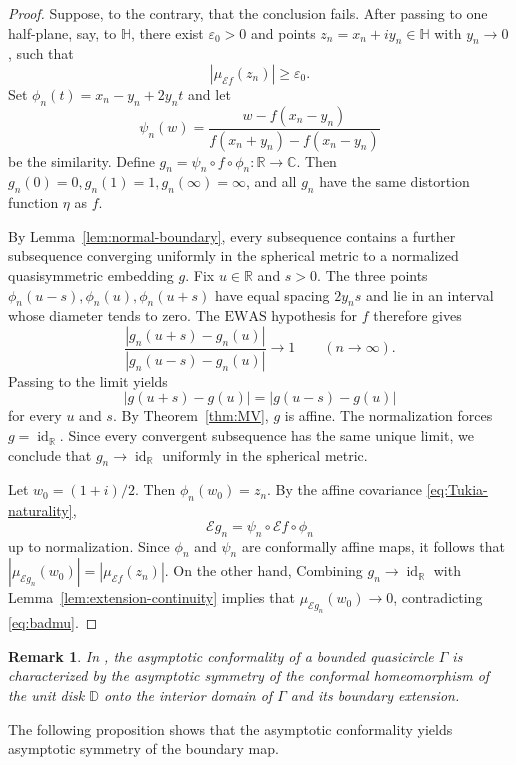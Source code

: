 \documentclass[10pt,a4paper]{amsart}
\numberwithin{equation}{section}
\newtheorem*{remark}{Remark} %
\newcommand{\R}{\mathbb{R}}
\newcommand{\C}{\mathbb{C}}
\newcommand{\Hh}{\mathbb{H}}
\newcommand{\id}{\operatorname{id}}
\begin{document}
\begin{proof}
Suppose, to the contrary, that the conclusion fails. 
After passing to one half-plane, say, to $\mathbb H$, there exist $\varepsilon_0>0$ and points
$z_n=x_n+iy_n\in\Hh$ with $y_n\to0$,
such that
\begin{equation}\label{eq:badmu}
 |\mu_{\mathcal Ef}(z_n)|\ge\varepsilon_0.
\end{equation}
Set
$\phi_n(t)=x_n-y_n+2y_nt$
and let
\[
 \psi_n(w)=
 \frac{w-f(x_n-y_n)}{f(x_n+y_n)-f(x_n-y_n)}
\]
be the similarity. 
Define
$g_n=\psi_n\circ f\circ\phi_n\colon\R\to\C$.
Then
$g_n(0)=0, g_n(1)=1, g_n(\infty)=\infty$, and all $g_n$ have the same distortion function $\eta$ as $f$.

By Lemma~\ref{lem:normal-boundary}, every subsequence contains a further
subsequence converging uniformly in the spherical metric to a normalized
quasisymmetric embedding $g$.  
Fix $u\in\R$ and $s>0$.  
The three points $\phi_n(u-s), \phi_n(u), \phi_n(u+s)$ have equal spacing $2y_ns$ and lie in an interval whose diameter tends to zero.  
The $\mathrm{EWAS}$ hypothesis for $f$ therefore gives
\[
 \frac{|g_n(u+s)-g_n(u)|}{|g_n(u-s)-g_n(u)|}\to 1 \qquad (n \to \infty).
\]
Passing to the limit yields
\[
 |g(u+s)-g(u)|=|g(u-s)-g(u)|
\]
for every $u$ and $s$.  
By Theorem~\ref{thm:MV}, $g$ is affine.  
The normalization forces $g=\id_{\R}$.  
Since every convergent subsequence has the same unique limit, we conclude that
$ g_n\to\id_{\R}$
uniformly in the spherical metric.

Let $w_0=(1+i)/2$.
Then $\phi_n(w_0)=z_n$. 
By the affine covariance \eqref{eq:Tukia-naturality},
\[
 \mathcal Eg_n
 =\psi_n\circ\mathcal Ef\circ\phi_n
\]
up to normalization.
Since $\phi_n$ and $\psi_n$ are conformally affine maps, 
it follows that $|\mu_{\mathcal Eg_n}(w_0)|=|\mu_{\mathcal Ef}(z_n)|$.
On the other hand, Combining $ g_n\to\id_{\R}$ with Lemma~\ref{lem:extension-continuity} implies that $\mu_{\mathcal Eg_n}(w_0)\to 0$, contradicting \eqref{eq:badmu}.
\end{proof}

\begin{remark}
In \cite{AndoniYang}, the asymptotic conformality of a bounded quasicircle $\Gamma$ is characterized by the asymptotic symmetry of the conformal homeomorphism of the unit disk $\mathbb D$ onto the interior domain of $\Gamma$ and its boundary extension.
\end{remark}


The following proposition shows that the asymptotic conformality yields asymptotic symmetry of the boundary map.
\end{document}
